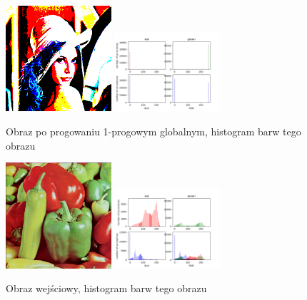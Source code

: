 \documentclass[final,a4paper,openany,12pt]{mwbk}
\begin{document}
\begin{figure}[H]
	\begin{center}
		\includegraphics[width=0.35\textwidth]{lena_color_globalSingleThreshold_result}
		\includegraphics[width=0.35\textwidth]{lena_color_globalSingleThreshold_histogram}
	\end{center}
	\caption{Obraz po progowaniu 1-progowym globalnym, histogram barw tego obrazu}
\end{figure}

\begin{figure}[H]
	\begin{center}
		\includegraphics[width=0.35\textwidth]{peppers_color}
		\includegraphics[width=0.35\textwidth]{peppers_color_histogram}
	\end{center}
	\caption{Obraz wejściowy, histogram barw tego obrazu}
\end{figure}
\end{document}
